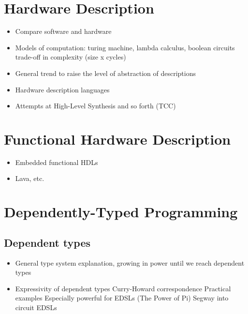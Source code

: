 \documentclass[a4paper,draft]{report}
\begin{document}
        \section{Hardware Description}
        \label{sec:hardware-description}
            \begin{itemize}
                \item Compare software and hardware
                \item Models of computation: turing machine, lambda calculus, boolean circuits
                    \subitem trade-off in complexity (size x cycles)

                \item General trend to raise the level of abstraction of descriptions
                \item Hardware description languages

                \item Attempts at High-Level Synthesis and so forth (TCC)
            \end{itemize}

        \section{Functional Hardware Description}
        \label{sec:functional-hardware}
            \begin{itemize}
                \item Embedded functional HDLs
                \item Lava, etc.
            \end{itemize}


        \section{Dependently-Typed Programming}
        \label{sec:dtp}

            \subsection{Dependent types}
            \label{subsec:dependent-types}
                \begin{itemize}
                    \item General type system explanation, growing in power until we reach dependent types
                    \item Expressivity of dependent types
                        \subitem Curry-Howard correspondence
                        \subitem Practical examples
                            \subsubitem Especially powerful for EDSLs (The Power of Pi)
                            \subsubitem Segway into circuit EDSLs
                \end{itemize}
\end{document}
